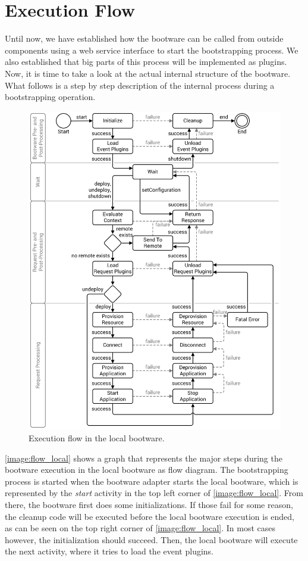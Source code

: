 \section{Execution Flow}
\label{design:flow}

Until now, we have established how the bootware can be called from outside components using a web service interface to start the bootstrapping process.
We also established that big parts of this process will be implemented as plugins.
Now, it is time to take a look at the actual internal structure of the bootware.
What follows is a step by step description of the internal process during a bootstrapping operation.

\begin{figure}[!htbp]
	\centering
	\includegraphics[resolution=600]{design/assets/flow_local}
	\caption{Execution flow in the local bootware.}
	\label{image:flow_local}
\end{figure}

\autoref{image:flow_local} shows a graph that represents the major steps during the bootware execution in the local bootware as flow diagram.
The bootstrapping process is started when the bootware adapter starts the local bootware, which is represented by the \textit{start} activity in the top left corner of \autoref{image:flow_local}.
From there, the bootware first does some initializations.
If those fail for some reason, the cleanup code will be executed before the local bootware execution is ended, as can be seen on the top right corner of \autoref{image:flow_local}.
In most cases however, the initialization should succeed.
Then, the local bootware will execute the next activity, where it tries to load the event plugins.


